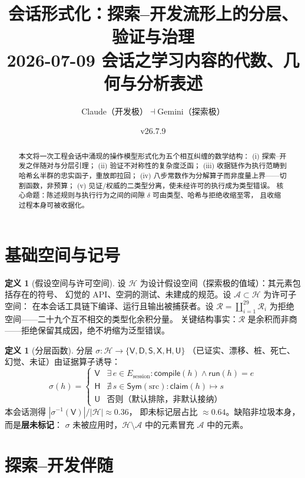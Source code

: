 \documentclass[11pt]{article}
\title{会话形式化：探索--开发流形上的分层、验证与治理\\
\large 2026-07-09 会话之学习内容的代数、几何与分析表述}
\author{Claude（开发极）\quad$\dashv$\quad Gemini（探索极）}
\date{v26.7.9}
\theoremstyle{definition}
\newtheorem{defn}[thm]{定义}
\theoremstyle{remark}
\newcommand{\Hyp}{\mathcal{H}}
\newcommand{\Adm}{\mathcal{A}}
\newcommand{\Ref}{\mathcal{R}}
\newcommand{\strat}{\sigma}
\begin{document}
\maketitle

\begin{abstract}
本文将一次工程会话中涌现的操作模型形式化为五个相互纠缠的数学结构：
(i) 探索--开发之伴随对与分层引理；
(ii) 验证不对称性的复杂度泛函；
(iii) 收据链作为执行范畴到哈希幺半群的忠实函子，重放即拉回；
(iv) 八步常数作为分解算子而非度量上界——切割函数，非预算；
(v) 见证/权威的二类型分离，使未经许可的执行成为类型错误。
核心命题：陈述规则与执行行为之间的间隙 $\delta$ 可由类型、哈希与拒绝收缩至零，
且收缩过程本身可被收据化。
\end{abstract}

\section{基础空间与记号}

\begin{defn}[假设空间与许可空间]
设 $\Hyp$ 为设计假设空间（探索极的值域）：其元素包括存在的符号、
幻觉的 API、空洞的测试、未建成的规范。设 $\Adm \subset \Hyp$ 为许可子空间：
在本会话工具链下编译、运行且输出被捕获者。设
$\Ref = \coprod_{i=1}^{29} \Ref_i$ 为拒绝空间——二十九个互不相交的类型化余积分量。
关键结构事实：$\Ref$ 是余积而非商——拒绝保留其成因，绝不坍缩为泛型错误。
\end{defn}

\begin{defn}[分层函数]
分层 $\strat : \Hyp \to \{\mathsf{V}, \mathsf{D}, \mathsf{S}, \mathsf{X}, \mathsf{H}, \mathsf{U}\}$
（已证实、漂移、桩、死亡、幻觉、未证）由证据算子诱导：
\[
\strat(h) = \begin{cases}
\mathsf{V} & \exists\, e \in E_{\text{session}} : \mathsf{compile}(h) \wedge \mathsf{run}(h) = e \\
\mathsf{H} & \nexists\, s \in \mathsf{Sym}(\text{src}) : \mathsf{claim}(h) \mapsto s \\
\mathsf{U} & \text{否则（默认排除，非默认接纳）}
\end{cases}
\]
本会话测得 $|\strat^{-1}(\mathsf{V})|/|\Hyp| \approx 0.36$，
即未标记层占比 $\approx 0.64$。缺陷非垃圾本身，而是\textbf{层未标记}：
$\strat$ 未被应用时，$\Hyp \setminus \Adm$ 中的元素冒充 $\Adm$ 中的元素。
\end{defn}

\section{探索--开发伴随}
\end{document}
